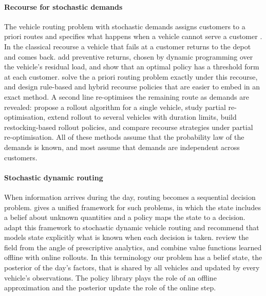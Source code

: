 \documentclass[preprint,authoryear,12pt]{elsarticle}
\begin{document}
\paragraph{Recourse for stochastic demands} The vehicle routing problem
with stochastic demands assigns customers to a priori routes and
specifies what happens when a vehicle cannot serve a customer
\citep{bertsimas1992vrpsd,gendreau1996stochastic,oyola2018svrp1}. In the
classical recourse a vehicle that fails at a customer returns to the
depot and comes back. \citet{yang2000restocking} add preventive returns,
chosen by dynamic programming over the vehicle's residual load, and show
that an optimal policy has a threshold form at each customer.
\citet{louveaux2018exact} solve the a priori routing problem exactly
under this recourse, and \citet{salavati2019rulebased,salavati2019hybrid}
design rule-based and hybrid recourse policies that are easier to embed
in an exact method. A second line re-optimises the remaining route as
demands are revealed: \citet{secomandi2001rollout} propose a rollout
algorithm for a single vehicle, \citet{secomandi2009reopt} study partial
re-optimisation, \citet{goodson2013rollout} extend rollout to several
vehicles with duration limits, \citet{goodson2016restocking} build
restocking-based rollout policies, and \citet{florio2022partial} compare
recourse strategies under partial re-optimisation. All of these methods
assume that the probability law of the demands is known, and most assume
that demands are independent across customers.

\paragraph{Stochastic dynamic routing} When information arrives during
the day, routing becomes a sequential decision problem.
\citet{powell2019unified} gives a unified framework for such problems,
in which the state includes a belief about unknown quantities and a
policy maps the state to a decision. \citet{ulmer2020modeling} adapt
this framework to stochastic dynamic vehicle routing and recommend that
models state explicitly what is known when each decision is taken.
\citet{soeffker2022review} review the field from the angle of
prescriptive analytics, and \citet{ulmer2019offline} combine value
functions learned offline with online rollouts. In this terminology our
problem has a belief state, the posterior of the day's factors, that is
shared by all vehicles and updated by every vehicle's observations. The
policy library plays the role of an offline approximation and the
posterior update the role of the online step.
\end{document}
